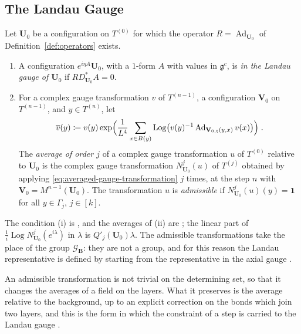 \documentclass[11pt]{preprint}
\newcommand{\id}{\mathbf 1}
\newcommand{\Ad}{\operatorname{Ad}}
\numberwithin{equation}{section}
\begin{document}
\subsection{The Landau Gauge}\label{sec:landau-gauge}

\begin{definition}\label{def:landau-gauge}
Let $\mathbf U_0$ be a configuration on $T^{(0)}$ for which the operator $R = \Ad_{\mathbf U_0}$ of Definition~\ref{def:operators} exists.
\begin{enumerate}[label=(\roman*)]
\item A configuration $e^{i\eta A}\mathbf U_0$, with a $1$-form $A$ with values in $\mathfrak g^c$, is \emph{in the Landau gauge of $\mathbf U_0$} if $RD^*_{\mathbf U_0}A = 0$.
\item For a complex gauge transformation $v$ of $T^{(n-1)}$, a configuration $\mathbf V_0$ on $T^{(n-1)}$, and $y \in T^{(n)}$, let
\begin{equation}\label{eq:averaged-gauge-transformation}
    \overline v(y) \coloneqq v(y)\exp\Bigl(\frac{1}{L^4}\sum_{x \in B(y)}\operatorname{Log}\bigl(v(y)^{-1}\Ad_{\mathbf V_{0,\mathfrak t}(y, x)}v(x)\bigr)\Bigr)\;.
\end{equation}
The \emph{average of order $j$} of a complex gauge transformation $u$ of $T^{(0)}$ relative to $\mathbf U_0$ is the complex gauge transformation $N^j_{\mathbf U_0}(u)$ of $T^{(j)}$ obtained by applying \eqref{eq:averaged-gauge-transformation} $j$ times, at the step $n$ with $\mathbf V_0 = M^{n-1}(\mathbf U_0)$. The transformation $u$ is \emph{admissible} if $N^j_{\mathbf U_0}(u)(y) = \id$ for all $y \in \Gamma_j$, $j \in [k]$.
\end{enumerate}
\end{definition}

The condition (i) is \cite[(1.27), p.~80]{BalabanREG}, and the averages of (ii) are \cite[(78)--(80), p.~30]{BalabanAVG}; the linear part of $\frac{1}{i}\operatorname{Log}N^j_{\mathbf U_0}(e^{i\lambda})$ in $\lambda$ is $Q'_j(\mathbf U_0)\lambda$. The admissible transformations take the place of the group $\mathcal G_{\mathbf B}$: they are not a group, and for this reason the Landau representative is defined by starting from the representative in the axial gauge \cite[pp.~80--81]{BalabanREG}.

An admissible transformation is not trivial on the determining set, so that it changes the averages of a field on the layers. What it preserves is the average relative to the background, up to an explicit correction on the bonds which join two layers, and this is the form in which the constraint of a step is carried to the Landau gauge \cite[(1.30), (1.31), pp.~81--82]{BalabanREG}.
\end{document}
